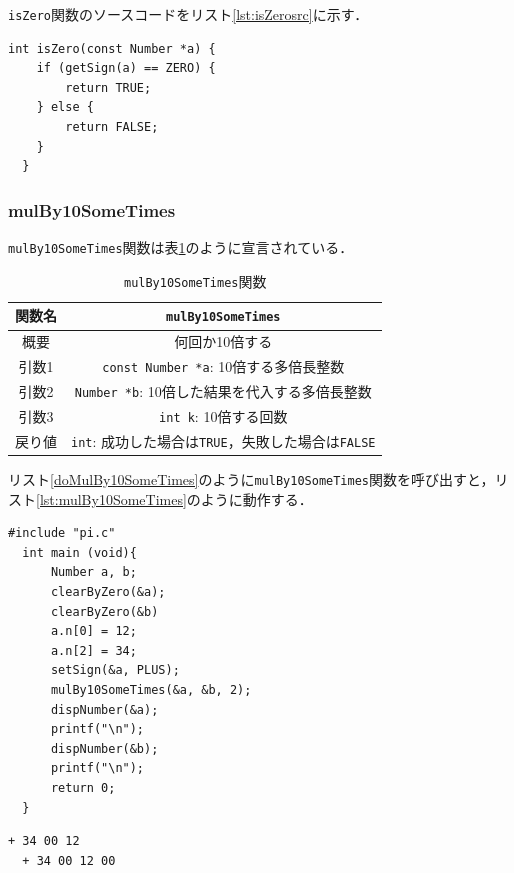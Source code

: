 \documentclass[a4paper,11pt,dvipdfmx]{jsarticle}
\begin{document}
\texttt{isZero}関数のソースコードをリスト\ref{lst:isZerosrc}に示す．

\begin{lstlisting}[caption=\texttt{isZero}関数,label=lst:isZerosrc]
  int isZero(const Number *a) {
    if (getSign(a) == ZERO) {
        return TRUE;
    } else {
        return FALSE;
    }
  }
\end{lstlisting}

\subsubsection{mulBy10SomeTimes}
\texttt{mulBy10SomeTimes}関数は表\ref{table:lst:mulBy10SomeTimes}のように宣言されている．

\begin{table}[H]
\centering
\caption{\texttt{mulBy10SomeTimes}関数}
\label{table:lst:mulBy10SomeTimes}
\begin{tabular}{c||c}
\hline
関数名    & \texttt{mulBy10SomeTimes}   \\
\hline
概要    & 何回か10倍する   \\
\hline
引数1   & \texttt{const Number *a}: 10倍する多倍長整数  \\
引数2   & \texttt{Number *b}: 10倍した結果を代入する多倍長整数  \\
引数3   & \texttt{int k}: 10倍する回数   \\
\hline
戻り値    & \texttt{int}: 成功した場合は\texttt{TRUE}，失敗した場合は\texttt{FALSE}   \\
\hline
\end{tabular}
\end{table}

リスト\ref{doMulBy10SomeTimes}のように\texttt{mulBy10SomeTimes}関数を呼び出すと，リスト\ref{lst:mulBy10SomeTimes}のように動作する．
\begin{lstlisting}[caption=\texttt{mulBy10SomeTimes}関数の呼び出し,label=doMulBy10SomeTimes]
  #include "pi.c"
  int main (void){
      Number a, b;
      clearByZero(&a);
      clearByZero(&b)
      a.n[0] = 12;
      a.n[2] = 34;
      setSign(&a, PLUS);
      mulBy10SomeTimes(&a, &b, 2);
      dispNumber(&a);
      printf("\n");
      dispNumber(&b);
      printf("\n");
      return 0;
  }
\end{lstlisting}

\begin{lstlisting}[caption=リスト\ref{doMulBy10SomeTimes}の実行結果,label=lst:mulBy10SomeTimes]
  + 34 00 12
  + 34 00 12 00
\end{lstlisting}
\end{document}

